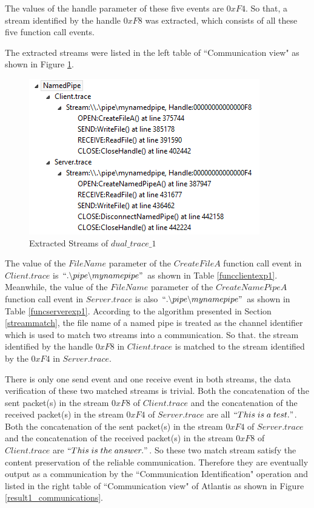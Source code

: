 The values of the handle parameter of these five events are $0xF4$. So that, a stream identified by the handle $0xF8$ was extracted, which consists of all these five function call events. 

The extracted streams were listed in the left table of ``Communication view"  as shown in Figure \ref{result1_streams}.

\begin{figure}[H]
\centerline{\includegraphics[scale=0.65]{Figures/result1_streams}}
 \caption{Extracted Streams of $dual\_trace\_1$}
\label{result1_streams}
\end{figure}

The value of the $FileName$ parameter of the $CreateFileA$ function call event in $Client.trace$ is $``.\backslash pipe \backslash mynamepipe"$ as shown in Table \ref{funcclientexp1}. Meanwhile, the value of the $FileName$ parameter of the $CreateNamePipeA$ function call event in $Server.trace$ is also $``.\backslash pipe \backslash mynamepipe"$ as shown in Table \ref{funcserverexp1}. According to the algorithm presented in Section \ref{streammatch}, the file name of a named pipe is treated as the channel identifier which is used to match two streams into a communication. So that. the stream identified by the handle $0xF8$ in $Client.trace$ is matched to the stream identified by the $0xF4$ in $Server.trace$.

There is only one send event and one receive event in both streams, the data verification of these two matched streams is trivial. Both the concatenation of the sent packet(s) in the stream $0xF8$ of $Client.trace$ and the concatenation of the received packet(s) in the stream $0xF4$ of $Server.trace$ are all $``This\; is\; a\; test."$. Both the concatenation of the sent packet(s) in the stream $0xF4$ of $Server.trace$ and the concatenation of the received packet(s) in the stream $0xF8$ of $Client.trace$ are $``This\; is\; the\; answer."$. So these two match stream satisfy the content preservation of the reliable communication. Therefore they are eventually output as a communication by the ``Communication Identification" operation and listed in the right table of ``Communication view" of Atlantis as shown in Figure \ref{result1_communications}.


